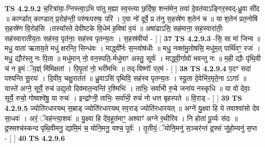 \documentclass[17pt]{extarticle}
\begin{document}
                  \newline
                                \textbf{ TS 4.2.9.2} \newline
                  च॒रित्रा॑या॒-ग्निस्त्वा॒ऽभि पा॑तु म॒ह्या स्व॒स्त्या छ॒र्दिषा॒ शन्त॑मेन॒ तया॑ दे॒वत॑याऽङ्गिर॒स्वद्-ध्रु॒वा सी॑द ॥ काण्डा᳚त् काण्डात् प्र॒रोह॑न्ती॒ परु॑षःपरुषः॒ परि॑ । ए॒वा नो॑ दूर्वे॒ प्र त॑नु स॒हस्रे॑ण श॒तेन॑ च ॥ या श॒तेन॑ प्रत॒नोषि॑ स॒हस्रे॑ण वि॒रोह॑सि ।तस्या᳚स्ते देवीष्टके वि॒धेम॑ ह॒विषा॑ व॒यं ॥ अषा॑ढाऽसि॒ सह॑माना॒ सह॒स्वारा॑तीः॒ सह॑स्वारातीय॒तः सह॑स्व॒ पृत॑नाः॒ सह॑स्व पृतन्य॒तः । स॒हस्र॑वीर्या - [  ] \textbf{  37} \newline
                  \newline
                                \textbf{ TS 4.2.9.3} \newline
                  -सि॒ सा मा॑ जिन्व ॥ मधु॒ वाता॑ ऋताय॒ते मधु॑ क्षरन्ति॒ सिन्ध॑वः । माद्ध्वी᳚र्नः स॒न्त्वोष॑धीः ॥ मधु॒ नक्त॑मु॒तोषसि॒ मधु॑म॒त् पार्थि॑वꣳ॒॒ रजः॑ । मधु॒ द्यौर॑स्तु नः पि॒ता ॥ मधु॑मान् नो॒ वन॒स्पति॒-र्मधु॑माꣳ अस्तु॒ सूर्यः॑ । माद्ध्वी॒र्गावो॑ भवन्तु नः ॥ म॒ही द्यौः पृ॑थि॒वी च॑ न इ॒मं ॅय॒ज्ञ्ं मि॑मिक्षतां । पि॒पृ॒तां नो॒ भरी॑मभिः ॥ तद्-विष्णोः᳚ पर॒मं - [  ] \textbf{  38} \newline
                  \newline
                                \textbf{ TS 4.2.9.4} \newline
                  प॒दꣳ सदा॑ पश्यन्ति सू॒रयः॑ । दि॒वीव॒ चक्षु॒रात॑तं ॥ ध्रु॒वाऽसि॑ पृथिवि॒ सह॑स्व पृतन्य॒तः । स्यू॒ता दे॒वेभि॑र॒मृते॒ना ऽऽगाः᳚ ॥ यास्ते॑ अग्ने॒ सूर्ये॒ रुच॑ उद्य॒तो दिव॑मात॒न्वन्ति॑ र॒श्मिभिः॑ । ताभिः॒ सर्वा॑भी रु॒चे जना॑य नस्कृधि ॥ या वो॑ देवाः॒ सूर्ये॒ रुचो॒ गोष्वश्वे॑षु॒ या रुचः॑ । इन्द्रा᳚ग्नी॒ ताभिः॒ सर्वा॑भी॒ रुचं॑ नो धत्त बृहस्पते ॥ वि॒राड् - [  ] \textbf{  39} \newline
                  \newline
                                \textbf{ TS 4.2.9.5} \newline
                  ज्योति॑रधारयथ् स॒म्राड् ज्योति॑रधारयथ् स्व॒राड् ज्योति॑रधारयत् ॥ अग्ने॑ यु॒क्ष्वा हि ये तवाश्वा॑सो देव सा॒धवः॑ । अरं॒ ॅवह॑न्त्या॒शवः॑ ॥ यु॒क्ष्वा हि दे॑व॒हूत॑माꣳ॒॒ अश्वाꣳ॑ अग्ने र॒थीरि॑व । नि होता॑ पू॒र्व्यः स॑दः ॥ द्र॒फ्सश्च॑स्कन्द पृथि॒वीमनु॒ द्यामि॒मं च॒ योनि॒मनु॒ यश्च॒ पूर्वः॑ । तृ॒तीयं॒ ॅयोनि॒मनु॑ स॒ञ्चर॑न्तं द्र॒फ्सं जु॑हो॒म्यनु॑ स॒प्त - [  ] \textbf{  40} \newline
                  \newline
                                \textbf{ TS 4.2.9.6} \newline
\end{document}
